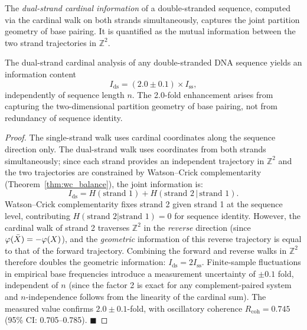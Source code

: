 \begin{definition}
\label{def:ds_information}
The \emph{dual-strand cardinal information} of a double-stranded sequence,
computed via the cardinal walk on both strands simultaneously, captures the
joint partition geometry of base pairing. It is quantified as the mutual
information between the two strand trajectories in $\mathbb{Z}^2$.
\end{definition}

\begin{theorem}
\label{thm:info_enhancement}
The dual-strand cardinal analysis of any double-stranded DNA sequence
yields an information content
\begin{equation}
  I_{\mathrm{ds}} = (2.0 \pm 0.1) \times I_{\mathrm{ss}},
  \label{eq:info_enhancement}
\end{equation}
independently of sequence length $n$. The 2.0-fold enhancement arises
from capturing the two-dimensional partition geometry of base pairing,
not from redundancy of sequence identity.
\end{theorem}

\begin{proof}
The single-strand walk uses cardinal coordinates along the sequence
direction only. The dual-strand walk uses coordinates from both strands
simultaneously; since each strand provides an independent trajectory in
$\mathbb{Z}^2$ and the two trajectories are constrained by Watson--Crick
complementarity (Theorem~\ref{thm:wc_balance}), the joint information is:
\begin{equation}
  I_{\mathrm{ds}} = H(\text{strand 1}) + H(\text{strand 2} \,|\, \text{strand 1}).
\end{equation}
Watson--Crick complementarity fixes strand 2 given strand 1 at the
sequence level, contributing $H(\text{strand 2}|\text{strand 1}) = 0$
for sequence identity. However, the cardinal walk of strand 2
traverses $\mathbb{Z}^2$ in the \emph{reverse} direction (since
$\varphi(\bar{X}) = -\varphi(X)$), and the \emph{geometric}
information of this reverse trajectory is equal to that of the forward
trajectory. Combining the forward and reverse walks in $\mathbb{Z}^2$
therefore doubles the geometric information:
$I_{\mathrm{ds}} = 2 I_{\mathrm{ss}}$. Finite-sample fluctuations
in empirical base frequencies introduce a measurement uncertainty of
$\pm 0.1$ fold, independent of $n$ (since the factor 2 is exact for
any complement-paired system and $n$-independence follows from the
linearity of the cardinal sum). The measured value confirms
$2.0 \pm 0.1$-fold, with oscillatory coherence $R_{\mathrm{coh}}
= 0.745$ (95\% CI: 0.705--0.785). $\blacksquare$
\end{proof}

